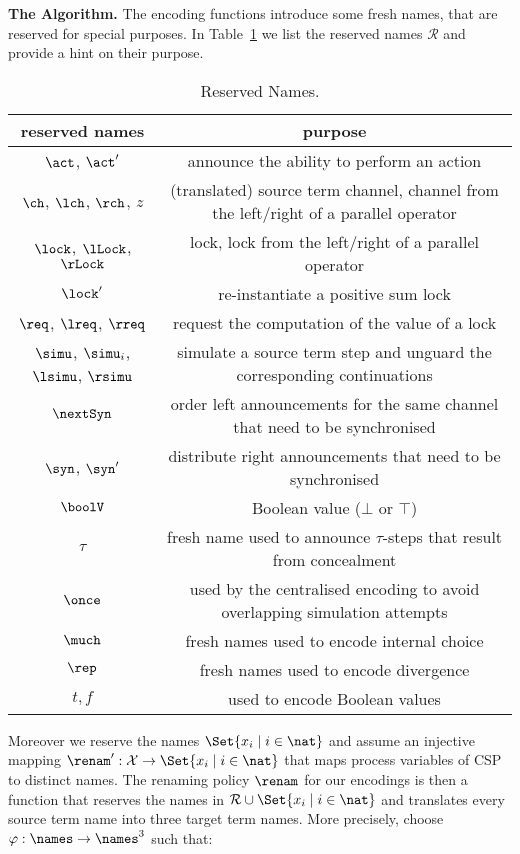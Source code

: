\documentclass[copyright,creativecommons]{eptcs}
\begin{document}
\vspace{0.3em}
\noindent
\textbf{The Algorithm.}\;
The encoding functions introduce some fresh names, that are reserved for special purposes. In Table~\ref{tab:resNam} we list the reserved names $ \mathcal{R} $ and provide a hint on their purpose.
\begin{table}[t]
	\begin{tabular}{|c|c|}
		\hline
		reserved names & purpose\\
		\hline
		$ \act $, $ \act' $ & announce the ability to perform an action\\
		$ \ch $, $ \lch $, $ \rch $, $ z $ & (translated) source term channel, channel from the left/right of a parallel operator\\
		$ \lock $, $ \lLock $, $ \rLock $ & lock, lock from the left/right of a parallel operator\\
		$ \lock' $ & re-instantiate a positive sum lock\\
		$ \req $, $ \lreq $, $ \rreq $ & request the computation of the value of a lock\\
		$ \simu $, $ \simu_i $, $ \lsimu $, $ \rsimu $ & simulate a source term step and unguard the corresponding continuations\\
		$ \nextSyn $ & order left announcements for the same channel that need to be synchronised\\
		$ \syn $, $ \syn' $ & distribute right announcements that need to be synchronised\\
		$ \boolV $ & Boolean value ($ \bot $ or $ \top $)\\
		$ \tau $ & fresh name used to announce $ \tau $-steps that result from concealment\\
		$ \once $ & used by the centralised encoding to avoid overlapping simulation attempts\\
		$ \much $ & fresh names used to encode internal choice\\
		$ \rep $ & fresh names used to encode divergence\\
		$ t, f $ & used to encode Boolean values\\
		\hline
	\end{tabular}
	\caption{Reserved Names.}
	\label{tab:resNam}
\end{table}
Moreover we reserve the names $ \Set{ x_i \mid i \in \nat } $ and assume an injective mapping $ \renam': \mathcal{X} \to \Set{ x_i \mid i \in \nat } $ that maps process variables of CSP to distinct names.
The renaming policy $ \renam $ for our encodings is then a function that reserves the names in $ \mathcal{R} \cup \Set{ x_i \mid i \in \nat } $ and translates every source term name into three target term names. More precisely, choose $ \varphi : \names \to \names^3 $ such that:
\end{document}
